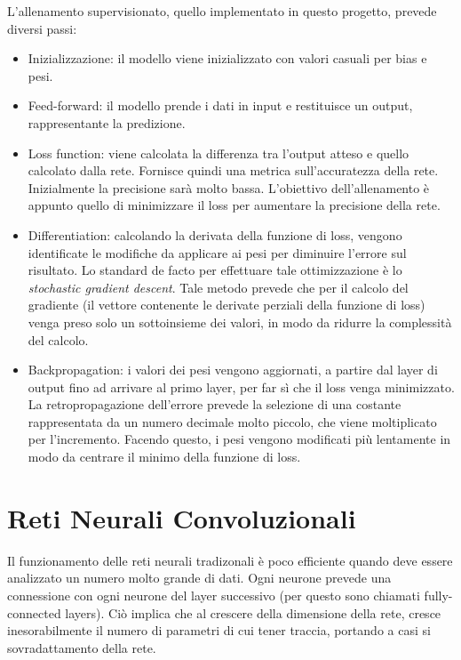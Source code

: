 \documentclass{article}
\begin{document}
L'allenamento supervisionato, quello implementato in questo progetto, prevede diversi passi:
\begin{itemize}
\item Inizializzazione: il modello viene inizializzato con valori casuali per bias e pesi. 
\item Feed-forward: il modello prende i dati in input e restituisce un output, rappresentante la predizione.
\item Loss function: viene calcolata la differenza tra l'output atteso e quello calcolato dalla rete. Fornisce quindi una metrica sull'accuratezza della rete.  Inizialmente la precisione sarà molto bassa. L'obiettivo dell'allenamento è appunto quello di minimizzare il loss per aumentare la precisione della rete. 
\item Differentiation: calcolando la derivata della funzione di loss, vengono identificate le modifiche da applicare ai pesi per diminuire l'errore sul risultato. Lo standard de facto per effettuare tale ottimizzazione è lo \textit{stochastic gradient descent}. Tale metodo prevede che per il calcolo del gradiente (il vettore contenente le derivate perziali della funzione di loss) venga preso solo un sottoinsieme dei valori, in modo da ridurre la complessità del calcolo.  
\item Backpropagation: i valori dei pesi vengono aggiornati, a partire dal layer di output fino ad arrivare al primo layer, per far sì che il loss venga minimizzato. La retropropagazione dell'errore prevede la selezione di una costante rappresentata da un numero decimale molto piccolo, che viene moltiplicato per l'incremento. Facendo questo, i pesi vengono modificati più lentamente in modo da centrare il minimo della funzione di loss.
\end{itemize}

\section{Reti Neurali Convoluzionali}
Il funzionamento delle reti neurali tradizonali è poco efficiente quando deve essere analizzato un numero molto grande di dati. Ogni neurone prevede una connessione con ogni neurone del layer successivo (per questo sono chiamati fully-connected layers). Ciò implica che al crescere della dimensione della rete, cresce inesorabilmente il numero di parametri di cui tener traccia, portando a casi si sovradattamento della rete.
\end{document}
